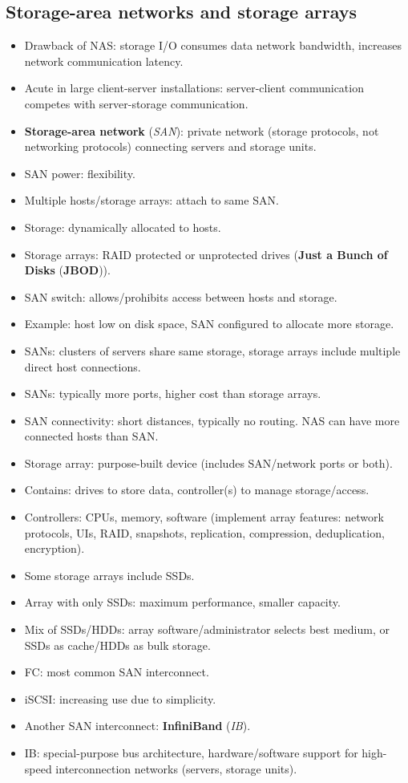 \subsection{Storage-area networks and storage arrays}
\begin{itemize}
    \item Drawback of NAS: storage I/O consumes data network bandwidth, increases network communication latency.
    \item Acute in large client-server installations: server-client communication competes with server-storage communication.
    \item \textbf{Storage-area network} (\textit{SAN}): private network (storage protocols, not networking protocols) connecting servers and storage units.
    \item SAN power: flexibility.
    \item Multiple hosts/storage arrays: attach to same SAN.
    \item Storage: dynamically allocated to hosts.
    \item Storage arrays: RAID protected or unprotected drives (\textbf{Just a Bunch of Disks} (\textbf{JBOD})).
    \item SAN switch: allows/prohibits access between hosts and storage.
    \item Example: host low on disk space, SAN configured to allocate more storage.
    \item SANs: clusters of servers share same storage, storage arrays include multiple direct host connections.
    \item SANs: typically more ports, higher cost than storage arrays.
    \item SAN connectivity: short distances, typically no routing. NAS can have more connected hosts than SAN.
    \item Storage array: purpose-built device (includes SAN/network ports or both).
    \item Contains: drives to store data, controller(s) to manage storage/access.
    \item Controllers: CPUs, memory, software (implement array features: network protocols, UIs, RAID, snapshots, replication, compression, deduplication, encryption).
    \item Some storage arrays include SSDs.
    \item Array with only SSDs: maximum performance, smaller capacity.
    \item Mix of SSDs/HDDs: array software/administrator selects best medium, or SSDs as cache/HDDs as bulk storage.
    \item FC: most common SAN interconnect.
    \item iSCSI: increasing use due to simplicity.
    \item Another SAN interconnect: \textbf{InfiniBand} (\textit{IB}).
    \item IB: special-purpose bus architecture, hardware/software support for high-speed interconnection networks (servers, storage units).
\end{itemize}

